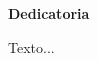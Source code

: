 
\newpage
\begin{center}
{\bf \Huge Dedicatoria}
\end{center}
\vspace{1cm}
\setlength{\baselineskip}{0.8cm}


Texto...